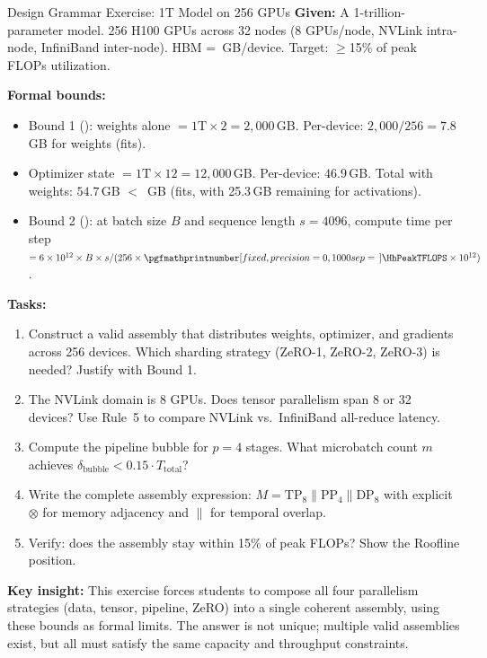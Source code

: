 \documentclass[10pt,twocolumn]{article}
\newcommand{\cvalint}[1]{\pgfmathprintnumber[fixed, precision=0, 1000 sep={\,}]{#1}}
\begin{document}
\begin{exercise}{Design Grammar Exercise: 1T Model on 256 GPUs}
\textbf{Given:} A 1-trillion-parameter model. 256 H100 GPUs across 32 nodes (8 GPUs/node, NVLink intra-node, InfiniBand inter-node). HBM = \cvalint{\HhHBMGB}\,GB/device. Target: $\geq$15\% of peak FLOPs utilization.

\textbf{Formal bounds:}
\begin{itemize}[nosep]
\item Bound 1 (): weights alone $= 1\text{T} \times 2 = 2{,}000$\,GB. Per-device: $2{,}000/256 = 7.8$\,GB for weights (fits).
\item Optimizer state $= 1\text{T} \times 12 = 12{,}000$\,GB. Per-device: $46.9$\,GB. Total with weights: $54.7$\,GB $<$ \cvalint{\HhHBMGB}\,GB (fits, with 25.3\,GB remaining for activations).
\item Bound 2 (): at batch size $B$ and sequence length $s = 4096$, compute time per step $= 6 \times 10^{12} \times B \times s / (256 \times \cvalint{\HhPeakTFLOPS} \times 10^{12})$.
\end{itemize}

\textbf{Tasks:}
\begin{enumerate}[nosep, leftmargin=*]
\item Construct a valid assembly that distributes weights, optimizer, and gradients across 256 devices. Which sharding strategy (ZeRO-1, ZeRO-2, ZeRO-3) is needed? Justify with Bound 1.
\item The NVLink domain is 8 GPUs. Does tensor parallelism span 8 or 32 devices? Use Rule~5 to compare NVLink vs.\ InfiniBand all-reduce latency.
\item Compute the pipeline bubble for $p = 4$ stages. What microbatch count $m$ achieves $\delta_{\text{bubble}} < 0.15 \cdot T_{\text{total}}$?
\item Write the complete assembly expression: $M = \text{TP}_8 \parallel \text{PP}_4 \parallel \text{DP}_8$ with explicit $\otimes$ for memory adjacency and $\parallel$ for temporal overlap.
\item Verify: does the assembly stay within 15\% of peak FLOPs? Show the Roofline position.
\end{enumerate}

\textbf{Key insight:} This exercise forces students to compose all four parallelism strategies (data, tensor, pipeline, ZeRO) into a single coherent assembly, using these bounds as formal limits. The answer is not unique; multiple valid assemblies exist, but all must satisfy the same capacity and throughput constraints.
\end{exercise}
\end{document}
